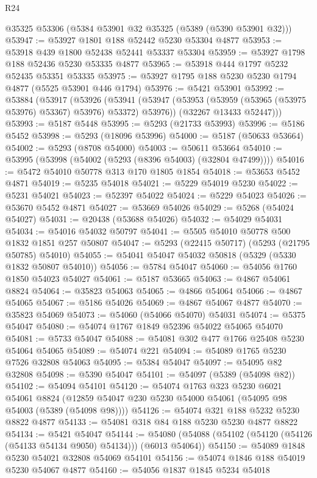 \begin{lexlean}{R24}
\begin{coremodule}
    @35325
    @53306
    (@5384 @53901 @32 @35325 (@5389 (@5390 @53901 @32)))
@53947 := @53927 @1801 @188 @52442 @5230 @53304 @4877
@53953 := @53918 @439 @1800 @52438 @52441 @53337 @53304
@53959 := @53927 @1798 @188 @52436 @5230 @53335 @4877
@53965 := @53918 @444 @1797 @5232 @52435 @53351 @53335
@53975 := @53927 @1795 @188 @5230 @5230 @1794 @4877 (@5525 @53901 @446 @1794)
@53976 := @5421 @53901
@53992 := @53884
    (@53917
      (@53926
        (@53941 (@53947 (@53953 (@53959 (@53965 (@53975 @53976) @53367) @53976) @53372) @53976))
        (@32267 @13433 @52447)))
@53993 := @5187 @5448
@53995 := @5293 (@21733 @53993)
@53996 := @5186 @5452
@53998 := @5293 (@18096 @53996)
@54000 := @5187 (@50633 @53664)
@54002 := @5293 (@8708 @54000)
@54003 := @50611 @53664
@54010 := @53995 (@53998 (@54002 (@5293 (@8396 @54003) (@32804 @47499))))
@54016 := @5472 @54010 @50778 @313 @170 @1805 @1854
@54018 := @53653 @5452 @4871
@54019 := @5235 @54018
@54021 := @5229 @54019 @5230
@54022 := @5231 @54021
@54023 := @52397 @54022
@54024 := @5229 @54023
@54026 := @53670 @5452 @4871
@54027 := @53669 @54026
@54029 := @5268 (@54024 @54027)
@54031 := @20438 (@53688 @54026)
@54032 := @54029 @54031
@54034 := @54016 @54032 @50797
@54041 := @5505 @54010 @50778 @500 @1832 @1851 @257 @50807
@54047 := @5293 (@22415 @50717) (@5293 (@21795 @50785) @54010)
@54055 := @54041 @54047 @54032 @50818 (@5329 (@5330 @1832 @50807 @54010))
@54056 := @5784 @54047
@54060 := @54056 @1760 @1850 @54023 @54027
@54061 := @5187 @53665
@54063 := @4867 @54061 @8824
@54064 := @35823 @54063
@54065 := @4866 @54064
@54066 := @4867 @54065
@54067 := @5186 @54026
@54069 := @4867 @54067 @4877
@54070 := @35823 @54069
@54073 := @54060 (@54066 @54070) @54031
@54074 := @5375 @54047
@54080 := @54074 @1767 @1849 @52396 @54022 @54065 @54070
@54081 := @5733 @54047
@54088 := @54081 @302 @477 @1766 @25408 @5230 @54064 @54065
@54089 := @54074 @221
@54094 := @54089 @1765 @5230 @7526 @32808 @54063
@54095 := @5384 @54047
@54097 := @54095 @82 @32808
@54098 := @5390 @54047
@54101 := @54097 (@5389 (@54098 @82))
@54102 := @54094 @54101
@54120 := @54074
    @1763
    @323
    @5230
    @6021
    @54061
    @8824
    (@12859 @54047 @230 @5230 @54000 @54061 (@54095 @98 @54003 (@5389 (@54098 @98))))
@54126 := @54074 @321 @188 @5232 @5230 @8822 @4877
@54133 := @54081 @318 @84 @188 @5230 @5230 @4877 @8822
@54134 := @5421 @54047
@54144 := @54080 (@54088 (@54102 (@54120 (@54126 (@54133 @54134 @9050) @54134))) (@6013 @54064))
@54150 := @54089 @1848 @5230 @54021 @32808 @54069 @54101
@54156 := @54074 @1846 @188 @54019 @5230 @54067 @4877
@54160 := @54056 @1837 @1845 @5234 @54018

\end{coremodule}
\end{lexlean}
